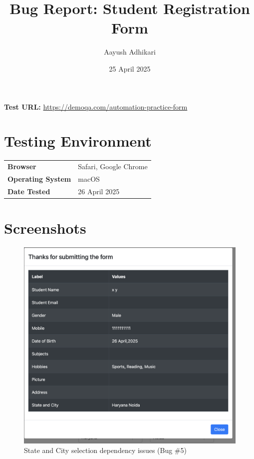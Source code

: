 \documentclass[12pt,a4paper]{article}
\title{Bug Report: Student Registration Form}
\author{Aayush Adhikari}
\date{25 April 2025}
\begin{document}
\maketitle
\thispagestyle{empty}

\begin{center}
    \large{\textbf{Test URL:} \url{https://demoqa.com/automation-practice-form}}
\end{center}

\vspace{1cm}

\tableofcontents
\newpage


\newpage


\newpage


\newpage


\newpage


\newpage


\newpage

\section{Testing Environment}

\begin{tabular}{ll}
\toprule
\textbf{Browser} & Safari, Google Chrome \\
\textbf{Operating System} & macOS \\
\textbf{Date Tested} & 26 April 2025 \\
\bottomrule
\end{tabular}

\section{Screenshots}
\begin{figure}[h!]
    \centering
    \includegraphics[width=0.5\linewidth]{images/Screenshot 2025-04-26 at 00.34.49.png}
    \caption{State and City selection dependency issues (Bug \#5)}
    \label{fig:enter-label}
\end{figure}
\end{document}
